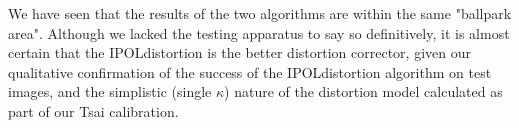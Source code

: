 We have seen that the results of the two algorithms are within the same "ballpark area". Although we lacked the testing apparatus to say so definitively, it is almost certain that the IPOLdistortion is the better distortion corrector, given our qualitative confirmation of the success of the IPOLdistortion algorithm on test images, and the simplistic (single $\kappa$) nature of the distortion model calculated as part of our Tsai calibration.
